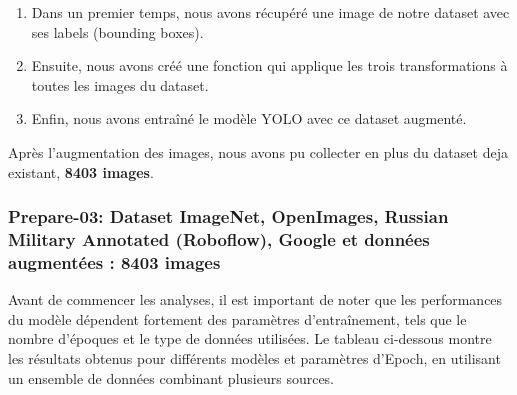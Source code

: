 \begin{enumerate}
	\item Dans un premier temps, nous avons récupéré une image de notre dataset avec ses labels (bounding boxes).
	\item Ensuite, nous avons créé une fonction qui applique les trois transformations à toutes les images du dataset.
	\item Enfin, nous avons entraîné le modèle YOLO avec ce dataset augmenté.
\end{enumerate}

Après l'augmentation des images, nous avons pu collecter en plus du dataset deja existant, \textbf{8403 images}.


\subsubsection*{Prepare-03: Dataset ImageNet, OpenImages, Russian Military Annotated (Roboflow), Google et données augmentées : 8403 images}

\begin{flushleft}
	Avant de commencer les analyses, il est important de noter que les performances du modèle dépendent fortement des paramètres d'entraînement, tels que le nombre d'époques et le type de données utilisées. Le tableau ci-dessous montre les résultats obtenus pour différents modèles et paramètres d'Epoch, en utilisant un ensemble de données combinant plusieurs sources.
\end{flushleft}

